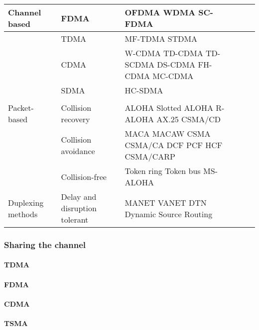 \begin{table}[h!]
\scriptsize
	\begin{tabulary}{\textwidth}{L|L|L|L|L}
	Channel based & FDMA                          & OFDMA WDMA SC-FDMA                              &  & \\\hline
	\             & TDMA                          & MF-TDMA STDMA                                   &  & \\\hline
	\             & CDMA                          & W-CDMA TD-CDMA TD-SCDMA DS-CDMA FH-CDMA MC-CDMA &  & \\\hline
	\             & SDMA                          & HC-SDMA                                         &  & \\\hline                                               &  & \\\hline
	Packet-based  & Collision recovery            & ALOHA Slotted ALOHA R-ALOHA AX.25 CSMA/CD       &  & \\\hline
	\             & Collision avoidance           & MACA MACAW CSMA CSMA/CA DCF PCF HCF CSMA/CARP   &  & \\\hline
	\             & Collision-free                & Token ring Token bus MS-ALOHA                   &  & \\\hline
	Duplexing methods  & Delay and disruption tolerant & MANET VANET DTN Dynamic Source Routing          &  & \\\hline

	\end{tabulary}
\caption{\label{tab:} }
\end{table}

\subsubsection{Sharing the channel}
\paragraph{TDMA}
\paragraph{FDMA}
\paragraph{CDMA}
\paragraph{TSMA}


